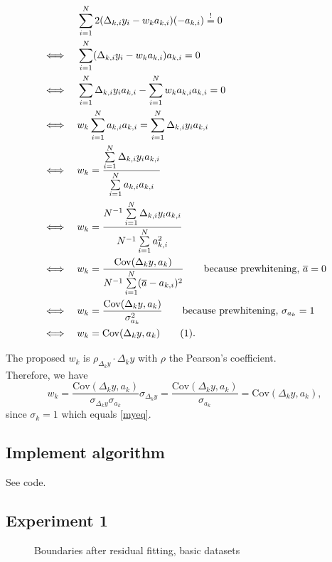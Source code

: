 \documentclass{article}
\begin{document}
\newcommand{\Cov}{\mathrm{Cov}}
\newcommand{\Var}{\mathrm{Var}}
\newcommand\numberthis{\addtocounter{equation}{1}\tag{\theequation}}
\begin{align*}
&\quad \sum\limits_{i=1}^N 2(\Delta_{k,i}y_i - w_k a_{k,i})(-a_{k,i}) \overset{!}{=} 0 \\
\iff &\quad \sum\limits_{i=1}^N (\Delta_{k,i}y_i - w_k a_{k,i})a_{k,i} = 0  \\
\iff &\quad\sum\limits_{i=1}^N \Delta_{k,i}y_i a_{k,i} - \sum\limits_{i=1}^N w_k a_{k,i} a_{k,i} = 0 \\
\iff &\quad w_k \sum\limits_{i=1}^N  a_{k,i} a_{k,i} = \sum\limits_{i=1}^N \Delta_{k,i}y_i a_{k,i} \\
\iff &\quad w_k = \frac{\sum\limits_{i=1}^N \Delta_{k,i}y_i a_{k,i}} {\sum\limits_{i=1}^N  a_{k,i} a_{k,i} }\\
\iff &\quad w_k = \frac{N^{-1}\sum\limits_{i=1}^N \Delta_{k,i}y_i a_{k,i}}{N^{-1}\sum\limits_{i=1}^N  a_{k,i}^2}  \\
\iff &\quad w_k = \frac{\Cov(\Delta_ky, a_k)}{N^{-1}\sum\limits_{i=1}^N  (\overline{a} - a_{k,i})^2} \qquad \text{because prewhitening, } \overline{a} = 0 \\
\iff &\quad w_k = \frac{\Cov(\Delta_ky, a_k)}{\sigma_{a_k}^2} \qquad \text{because prewhitening, } \sigma_{a_k} = 1 \\
\iff &\quad w_k = \Cov(\Delta_ky, a_k) \numberthis\label{myeq}.
\end{align*}

The proposed $w_k$ is $\rho_{\Delta_ky} \cdot {\Delta_k}y$ with $\rho$ the Pearson's coefficient. \\ Therefore, we have
\begin{equation*}
w_k= \frac{\Cov(\Delta_ky, a_k)}{\sigma_{\Delta_ky} \sigma_{a_k}} \sigma_{\Delta_ky} = \frac{\Cov(\Delta_ky, a_k)}{\sigma_{a_k}} = \Cov(\Delta_ky, a_k),
\end{equation*}
since \(\sigma_k=1\) which equals \ref{myeq}.
\subsection{Implement algorithm}
See code.
\subsection{Experiment 1}
	\begin{figure}[H]
	\centering

	\caption{\label{resfit1}Boundaries after residual fitting, basic datasets}
     \end{figure}
\end{document}
